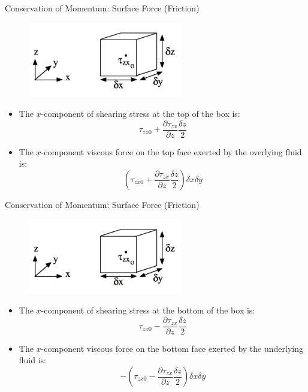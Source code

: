 \begin{frame}{Conservation of Momentum: Surface Force (Friction)}
\begin{figure}
		\includegraphics[width=0.6\textwidth]{friction7.png}	
	\end{figure}
\begin{itemize}
	\item The $x$-component of shearing stress at the top of the box is:
	$$\tau_{zx0} + \frac{\partial \tau_{zx}}{\partial z}\frac{\delta z}{2}$$
	\item The $x$-component viscous force on the top face exerted by the overlying fluid is:
	$$\left( \tau_{zx0} + \frac{\partial \tau_{zx}}{\partial z} \frac{\delta z}{2}\right)\delta x \delta y$$
\end{itemize}
\end{frame}
\begin{frame}{Conservation of Momentum: Surface Force (Friction)}
\begin{figure}
		\includegraphics[width=0.6\textwidth]{friction7.png}	
	\end{figure}
\begin{itemize}
	\item The $x$-component of shearing stress at the bottom of the box is:
	$$\tau_{zx0} - \frac{\partial \tau_{zx}}{\partial z}\frac{\delta z}{2}$$
	\item The $x$-component viscous force on the bottom face exerted by the underlying fluid is:
	$$-\left( \tau_{zx0} - \frac{\partial \tau_{zx}}{\partial z} \frac{\delta z}{2}\right)\delta x \delta y$$
\end{itemize}
\end{frame}
